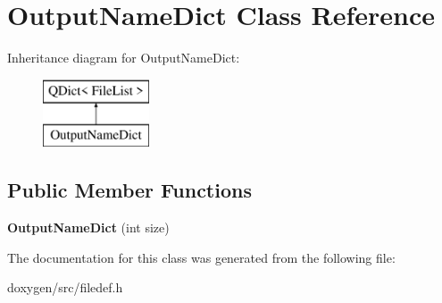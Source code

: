 \hypertarget{class_output_name_dict}{}\section{Output\+Name\+Dict Class Reference}
\label{class_output_name_dict}
Inheritance diagram for Output\+Name\+Dict\+:\begin{figure}[H]
\begin{center}
\leavevmode
\includegraphics[height=2.000000cm]{class_output_name_dict}
\end{center}
\end{figure}
\subsection*{Public Member Functions}
\begin{DoxyCompactItemize}
\item 
\mbox{\label{class_output_name_dict_acd65e261a4a3441cd0a272cef36138c0}} 
{\bfseries Output\+Name\+Dict} (int size)
\end{DoxyCompactItemize}


The documentation for this class was generated from the following file\+:\begin{DoxyCompactItemize}
\item 
doxygen/src/filedef.\+h\end{DoxyCompactItemize}
